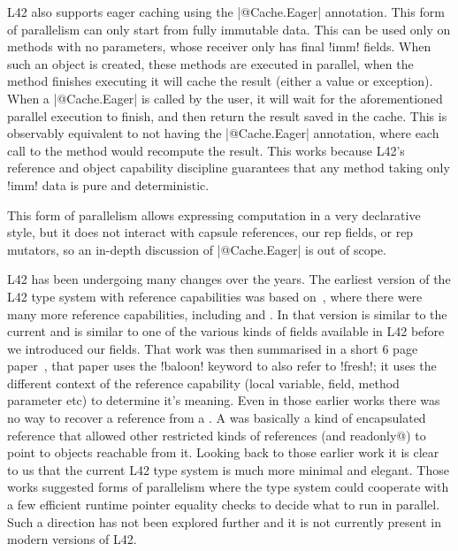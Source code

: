 L42 also supports eager caching using the \Q|@Cache.Eager| annotation.
This form of parallelism can only start from fully immutable data.
This can be used only on methods with no parameters,
whose receiver only has final \Q!imm! fields.
When such an object is created, these methods are executed in parallel, when the method finishes executing it will cache the result (either a value or exception).
When a \Q|@Cache.Eager| is called by the user, it will wait for the aforementioned parallel execution to finish, and then return the result saved in the cache.
This is observably equivalent to not having the \Q|@Cache.Eager| annotation, where each call to the method would recompute the result.
This works because L42's reference and object capability discipline guarantees that any method taking only \Q!imm! data is pure and deterministic.

This form of parallelism allows expressing computation in a very declarative style, but it does not interact with capsule references, our rep fields, or rep mutators, so an in-depth discussion of \Q|@Cache.Eager| is out of scope.

L42 has been undergoing many changes over the years.
The earliest version of the L42 type system with reference capabilities was based on~\cite{servettoballoon},
where there were many more reference capabilities, including
\Q@fresh@ and \Q@baloon@.
In that version \Q@fresh@ is similar to the current \Q@capsule@ and \Q@baloon@ is similar to one of the various kinds of \Q@capsule@ fields available in L42 before we introduced our \Q@rep@ fields.
That work was then summarised in a short 6 page paper~\cite{ServettoEtAl13a}, that
paper uses the \Q!baloon! keyword to also refer to \Q!fresh!; it uses the different context of the reference capability (local variable, field, method parameter etc) to determine it's meaning.
Even in those earlier works there was no way to recover a \Q@fresh@ reference from a \Q@baloon@. A \Q@baloon@ was basically a kind of encapsulated reference that allowed other restricted kinds of references (\Q@external@ and \Q@external readonly@) to point to objects reachable from it. Looking back to those earlier work it is clear to us that the current L42 type system is much more minimal and elegant.
Those works suggested forms of parallelism where the type system could cooperate with a few efficient runtime pointer equality checks to decide what to run in parallel.
Such a direction has not been explored further and it is not currently present in modern versions of L42.
